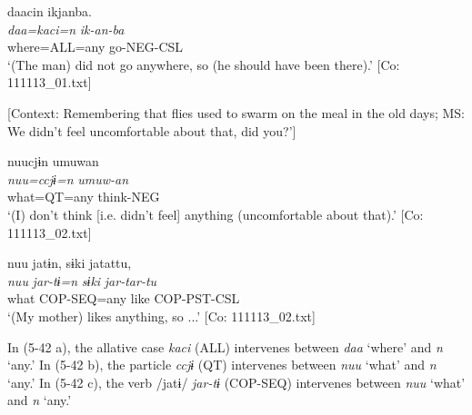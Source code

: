 \glll  daacin  ikjanba.\\
\textit{daa=kaci=n}  \textit{ik-an-ba}\\
where=ALL=any  go-NEG-CSL\\
\glt ‘(The man) did not go anywhere, so (he should have been there).’ [Co: 111113\_01.txt]

 \ex \label{ex:5:b} [Context: Remembering that flies used to swarm on the meal in the old days; MS: We didn’t feel uncomfortable about that, did you?’]

\glll  nuucjɨn  umuwan\\
\textit{nuu=ccjɨ=n}  \textit{umuw-an}\\
what=QT=any  think-NEG\\
\glt ‘(I) don’t think [i.e. didn’t feel] anything (uncomfortable about that).’ [Co: 111113\_02.txt]

 \ex \label{ex:5:c} %
\glll  nuu  jatɨn,  sɨki  jatattu,\\
\textit{nuu}  \textit{jar-tɨ=n}  \textit{sɨki}  \textit{jar-tar-tu}\\
what  COP-SEQ=any  like  COP-PST-CSL\\
\glt ‘(My mother) likes anything, so ...’ [Co: 111113\_02.txt]
\z
\z

In (5-42 a), the allative case \textit{kaci} (ALL) intervenes between \textit{daa} ‘where’ and \textit{n} ‘any.’ In (5-42 b), the particle \textit{ccjɨ} (QT) intervenes between \textit{nuu} ‘what’ and \textit{n} ‘any.’ In (5-42 c), the verb /jatɨ/ \textit{jar-tɨ} (COP-SEQ) intervenes between \textit{nuu} ‘what’ and \textit{n} ‘any.’
